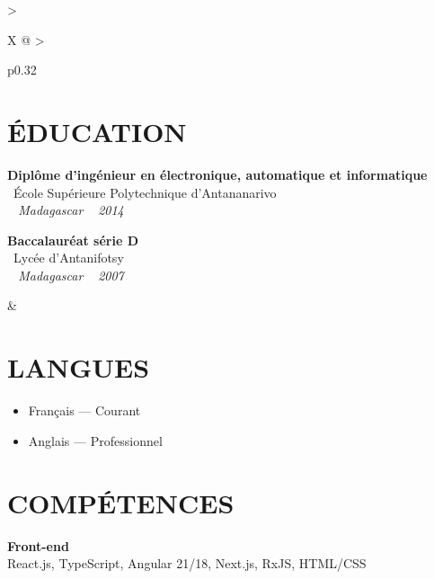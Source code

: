 \documentclass[10pt,a4paper]{article}
\begin{document}
\setlength{\tabcolsep}{0pt}
\begin{tabularx}{\textwidth}{
  >{\raggedright\arraybackslash}X
  @{\hspace{1cm}}
  >{\raggedright\arraybackslash}p{0.32\textwidth}
}
\begin{minipage}[t]{\linewidth}
\section*{ÉDUCATION}

\textbf{Diplôme d'ingénieur en électronique, automatique et informatique}\\
\textcolor{primary}{ \faGraduationCap\ École Supérieure Polytechnique d'Antananarivo}\\
\textit{ \small \textcolor{darkgray}{ \faMapMarker\ } Madagascar } \hfill  \textit{ \small \textcolor{darkgray}{ \faCalendar\ } 2014 }

\vspace{6pt}

\textbf{Baccalauréat série D}\\
\textcolor{primary}{ \faGraduationCap\ Lycée d'Antanifotsy}\\
\textit{ \small \textcolor{darkgray}{ \faMapMarker\ } Madagascar } \hfill  \textit{ \small \textcolor{darkgray}{ \faCalendar\ } 2007 }
\end{minipage}
&
\begin{minipage}[t]{\linewidth}

\section*{LANGUES}

\begin{itemize}
  \item Français --- Courant
  \item Anglais --- Professionnel
\end{itemize}

\section*{COMPÉTENCES}

\textbf{\color{primary} Front-end}\\
\color{darkgray} React.js, TypeScript, Angular 21/18, Next.js, RxJS, HTML/CSS

\vspace{4pt}


\end{minipage}
\end{tabularx}
\end{document}

